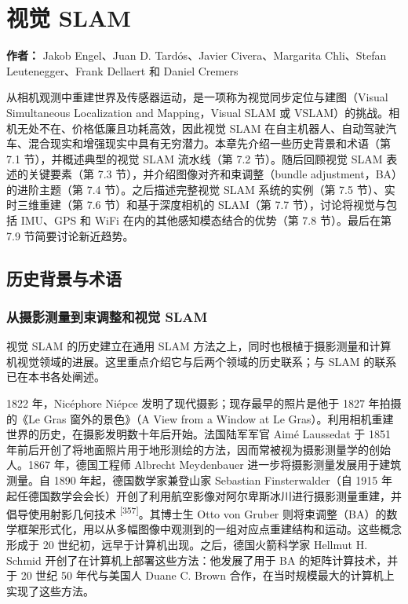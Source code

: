 \chapter{视觉 SLAM}

\textbf{作者：} Jakob Engel、Juan D. Tardós、Javier Civera、Margarita Chli、Stefan Leutenegger、Frank Dellaert 和 Daniel Cremers

从相机观测中重建世界及传感器运动，是一项称为视觉同步定位与建图（Visual Simultaneous Localization and Mapping，Visual SLAM 或 VSLAM）的挑战。相机无处不在、价格低廉且功耗高效，因此视觉 SLAM 在自主机器人、自动驾驶汽车、混合现实和增强现实中具有无穷潜力。本章先介绍一些历史背景和术语（第 7.1 节），并概述典型的视觉 SLAM 流水线（第 7.2 节）。随后回顾视觉 SLAM 表述的关键要素（第 7.3 节），并介绍图像对齐和束调整（bundle adjustment，BA）的进阶主题（第 7.4 节）。之后描述完整视觉 SLAM 系统的实例（第 7.5 节）、实时三维重建（第 7.6 节）和基于深度相机的 SLAM（第 7.7 节），讨论将视觉与包括 IMU、GPS 和 WiFi 在内的其他感知模态结合的优势（第 7.8 节）。最后在第 7.9 节简要讨论新近趋势。

\section{历史背景与术语}

\subsection{从摄影测量到束调整和视觉 SLAM}

视觉 SLAM 的历史建立在通用 SLAM 方法之上，同时也根植于摄影测量和计算机视觉领域的进展。这里重点介绍它与后两个领域的历史联系；与 SLAM 的联系已在本书各处阐述。

1822 年，Nicéphore Niépce 发明了现代摄影；现存最早的照片是他于 1827 年拍摄的《Le Gras 窗外的景色》（A View from a Window at Le Gras）。利用相机重建世界的历史，在摄影发明数十年后开始。法国陆军军官 Aimé Laussedat 于 1851 年前后开创了将地面照片用于地形测绘的方法，因而常被视为摄影测量学的创始人。1867 年，德国工程师 Albrecht Meydenbauer 进一步将摄影测量发展用于建筑测量。自 1890 年起，德国数学家兼登山家 Sebastian Finsterwalder（自 1915 年起任德国数学会会长）开创了利用航空影像对阿尔卑斯冰川进行摄影测量重建，并倡导使用射影几何技术 \textsuperscript{[357]}。其博士生 Otto von Gruber 则将束调整（BA）的数学框架形式化，用以从多幅图像中观测到的一组对应点重建结构和运动。这些概念形成于 20 世纪初，远早于计算机出现。之后，德国火箭科学家 Hellmut H. Schmid 开创了在计算机上部署这些方法：他发展了用于 BA 的矩阵计算技术，并于 20 世纪 50 年代与美国人 Duane C. Brown 合作，在当时规模最大的计算机上实现了这些方法。


